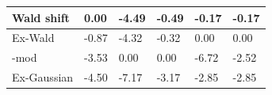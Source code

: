 \begin{tabular}{|l|l|l|l|l|l|}
\hline
Wald shift&0.00&-4.49&-0.49&-0.17&-0.17\\\hline
Ex-Wald&-0.87&-4.32&-0.32&0.00&0.00\\\hline
\rocdd{}-mod&-3.53&0.00&0.00&-6.72&-2.52\\\hline
Ex-Gaussian&-4.50&-7.17&-3.17&-2.85&-2.85\\\hline
\end{tabular}
